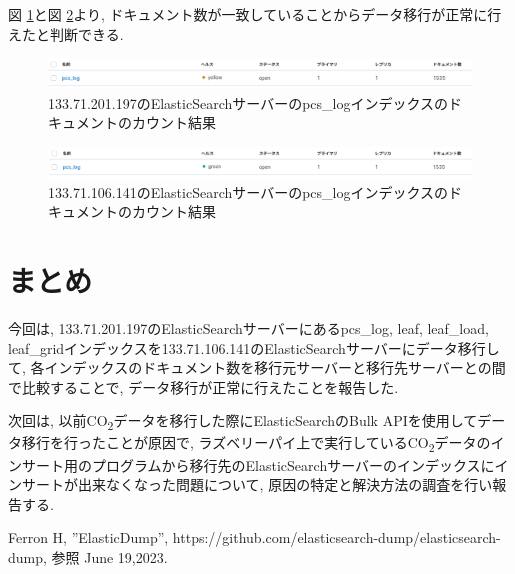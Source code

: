 \documentclass[a4j,12pt,]{jarticle}
\begin{document}
図 \ref{p4}と図 \ref{p5}より, ドキュメント数が一致していることからデータ移行が正常に行えたと判断できる.

\begin{figure}[H]
  \begin{center}
    \includegraphics[width=160mm]{197pcs.png}
    \caption{133.71.201.197のElasticSearchサーバーのpcs\_logインデックスのドキュメントのカウント結果}
    \label{p4}
  \end{center}
\end{figure}

\begin{figure}[H]
  \begin{center}
    \includegraphics[width=160mm]{141pcs.png}
    \caption{133.71.106.141のElasticSearchサーバーのpcs\_logインデックスのドキュメントのカウント結果}
    \label{p5}
  \end{center}
\end{figure}

\section{まとめ}
今回は, 133.71.201.197のElasticSearchサーバーにあるpcs\_log, leaf, leaf\_load, leaf\_gridインデックスを133.71.106.141のElasticSearchサーバーにデータ移行して, 各インデックスのドキュメント数を移行元サーバーと移行先サーバーとの間で比較することで, データ移行が正常に行えたことを報告した.


次回は, 以前CO\textsubscript{2}データを移行した際にElasticSearchのBulk APIを使用してデータ移行を行ったことが原因で, ラズベリーパイ上で実行しているCO\textsubscript{2}データのインサート用のプログラムから移行先のElasticSearchサーバーのインデックスにインサートが出来なくなった問題について, 原因の特定と解決方法の調査を行い報告する.


\begin{thebibliography}{5}
  Ferron H, ”ElasticDump”, https://github.com/elasticsearch-dump/elasticsearch-dump, 参照 June 19,2023.
\end{thebibliography}
\end{document}
